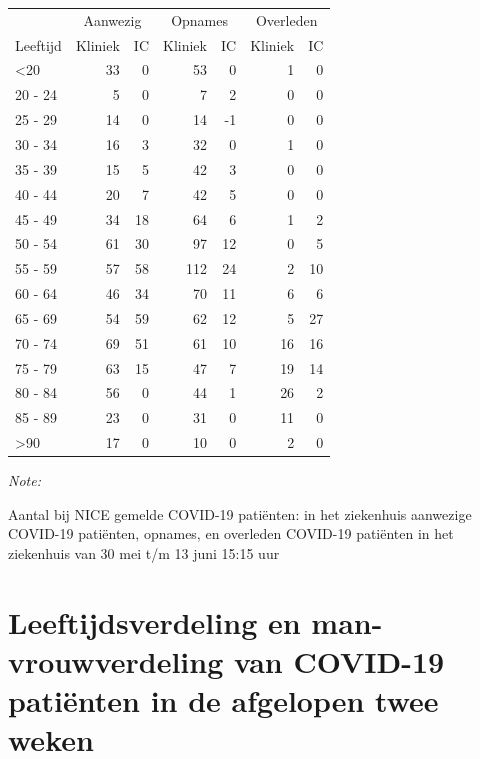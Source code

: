 \documentclass[
  english,
  man,floatsintext]{apa6}
\begin{document}
\begin{table}
\centering\begingroup\fontsize{10}{12}\selectfont

\begin{threeparttable}
\begin{tabular}{lrrrrrr}
\toprule
\multicolumn{1}{c}{ } & \multicolumn{2}{c}{Aanwezig} & \multicolumn{2}{c}{Opnames} & \multicolumn{2}{c}{Overleden} \\
\cmidrule(l{3pt}r{3pt}){2-3} \cmidrule(l{3pt}r{3pt}){4-5} \cmidrule(l{3pt}r{3pt}){6-7}
Leeftijd & Kliniek & IC & Kliniek & IC & Kliniek & IC\\
\midrule
<20 & 33 & 0 & 53 & 0 & 1 & 0\\
20 - 24 & 5 & 0 & 7 & 2 & 0 & 0\\
25 - 29 & 14 & 0 & 14 & -1 & 0 & 0\\
30 - 34 & 16 & 3 & 32 & 0 & 1 & 0\\
35 - 39 & 15 & 5 & 42 & 3 & 0 & 0\\
40 - 44 & 20 & 7 & 42 & 5 & 0 & 0\\
45 - 49 & 34 & 18 & 64 & 6 & 1 & 2\\
50 - 54 & 61 & 30 & 97 & 12 & 0 & 5\\
55 - 59 & 57 & 58 & 112 & 24 & 2 & 10\\
60 - 64 & 46 & 34 & 70 & 11 & 6 & 6\\
65 - 69 & 54 & 59 & 62 & 12 & 5 & 27\\
70 - 74 & 69 & 51 & 61 & 10 & 16 & 16\\
75 - 79 & 63 & 15 & 47 & 7 & 19 & 14\\
80 - 84 & 56 & 0 & 44 & 1 & 26 & 2\\
85 - 89 & 23 & 0 & 31 & 0 & 11 & 0\\
>90 & 17 & 0 & 10 & 0 & 2 & 0\\
\bottomrule
\end{tabular}
\begin{tablenotes}
\item \textit{Note: } 
\item Aantal bij NICE gemelde COVID-19 patiënten: in het ziekenhuis aanwezige COVID-19 patiënten, opnames, en overleden COVID-19 patiënten in het ziekenhuis van 30 mei t/m 13 juni 15:15 uur
\end{tablenotes}
\end{threeparttable}
\endgroup{}
\end{table}

\newpage

\hypertarget{leeftijdsverdeling-en-man-vrouwverdeling-van-covid-19-patiuxebnten-in-de-afgelopen-twee-weken}{%
\section{Leeftijdsverdeling en man-vrouwverdeling van COVID-19 patiënten in de afgelopen twee weken}\label{leeftijdsverdeling-en-man-vrouwverdeling-van-covid-19-patiuxebnten-in-de-afgelopen-twee-weken}}
\end{document}
